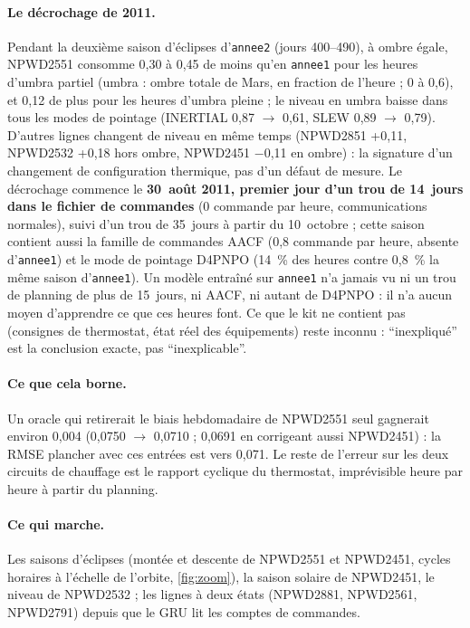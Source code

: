 \documentclass[11pt,a4paper]{article}
\begin{document}
\paragraph{Le décrochage de 2011.} Pendant la deuxième saison d'éclipses d'\texttt{annee2} (jours 400--490), à ombre égale, NPWD2551 consomme 0,30 à 0,45 de moins qu'en \texttt{annee1} pour les heures d'umbra partiel (umbra : ombre totale de Mars, en fraction de l'heure ; 0 à 0,6), et 0,12 de plus pour les heures d'umbra pleine ; le niveau en umbra baisse dans tous les modes de pointage (INERTIAL 0,87 $\rightarrow$ 0,61, SLEW 0,89 $\rightarrow$ 0,79). D'autres lignes changent de niveau en même temps (NPWD2851 +0,11, NPWD2532 +0,18 hors ombre, NPWD2451 $-$0,11 en ombre) : la signature d'un changement de configuration thermique, pas d'un défaut de mesure. Le décrochage commence le \textbf{30~août 2011, premier jour d'un trou de 14~jours dans le fichier de commandes} (0 commande par heure, communications normales), suivi d'un trou de 35~jours à partir du 10~octobre ; cette saison contient aussi la famille de commandes AACF (0,8 commande par heure, absente d'\texttt{annee1}) et le mode de pointage D4PNPO (14~\% des heures contre 0,8~\% la même saison d'\texttt{annee1}). Un modèle entraîné sur \texttt{annee1} n'a jamais vu ni un trou de planning de plus de 15~jours, ni AACF, ni autant de D4PNPO : il n'a aucun moyen d'apprendre ce que ces heures font. Ce que le kit ne contient pas (consignes de thermostat, état réel des équipements) reste inconnu : \enquote{inexpliqué} est la conclusion exacte, pas \enquote{inexplicable}.

\paragraph{Ce que cela borne.} Un oracle qui retirerait le biais hebdomadaire de NPWD2551 seul gagnerait environ 0,004 (0,0750 $\rightarrow$ 0,0710 ; 0,0691 en corrigeant aussi NPWD2451) : la RMSE plancher avec ces entrées est vers 0,071. Le reste de l'erreur sur les deux circuits de chauffage est le rapport cyclique du thermostat, imprévisible heure par heure à partir du planning.

\paragraph{Ce qui marche.} Les saisons d'éclipses (montée et descente de NPWD2551 et NPWD2451, cycles horaires à l'échelle de l'orbite, \autoref{fig:zoom}), la saison solaire de NPWD2451, le niveau de NPWD2532 ; les lignes à deux états (NPWD2881, NPWD2561, NPWD2791) depuis que le GRU lit les comptes de commandes.
\end{document}
